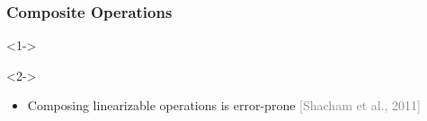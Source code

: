 \documentclass{beamer}
\begin{document}

\begin{frame} \frametitle{Composite Operations}
\begin{example}<1->
        
\end{example}
\begin{example}<2->
        
\end{example}
\begin{itemize}
    \item<3> Composing linearizable operations is error-prone \textcolor{gray}{[Shacham et al., 2011]}
    \end{itemize}
\end{frame}
\end{document}
